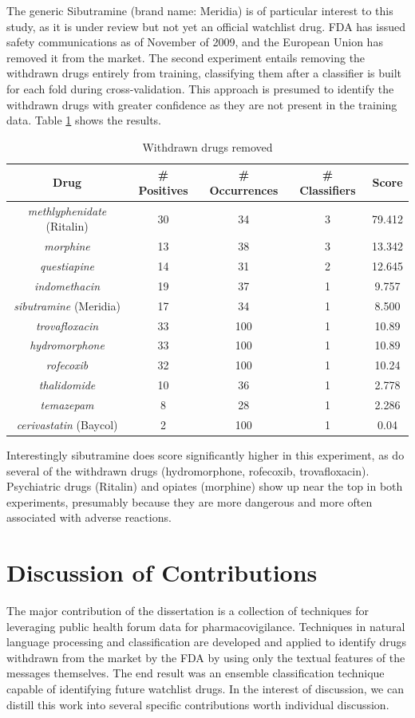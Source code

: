 \documentclass[twoside,11pt]{article}
\begin{document}
The generic Sibutramine (brand name: Meridia) is of particular interest to this study, as it is under review but not yet an official watchlist drug. FDA has issued safety communications as of November of 2009, and the European Union has removed it from the market.
The second experiment entails removing the withdrawn drugs entirely from training, classifying them after a classifier is built for each fold during cross-validation. This approach is presumed to identify the withdrawn drugs with greater confidence as they are not present in the training data. Table \ref{table7} shows the results.
\begin{table}[H]
  \centering
  \caption{Withdrawn drugs removed}
  \label{table7}
  \begin{tabular}{||c|c|c|c|c||}
    \hline
    Drug & # Positives & # Occurrences & # Classifiers & Score \\
    \hline\hline
    \textit{methlyphenidate} (Ritalin) & 30 & 34 & 3 & 79.412 \\
    \hline
    \textit{morphine} & 13 & 38 & 3 & 13.342 \\
    \hline
    \textit{questiapine} & 14 & 31 & 2 & 12.645 \\
    \hline
    \textit{indomethacin} & 19 & 37 & 1 & 9.757 \\
    \hline
    \textit{sibutramine} (Meridia) & 17 & 34 & 1 & 8.500\\
    \hline\hline
    \textit{trovafloxacin} & 33 & 100 & 1 & 10.89\\
    \hline
    \textit{hydromorphone} & 33 & 100 & 1 & 10.89\\
    \hline
    \textit{rofecoxib} & 32 & 100 & 1 & 10.24 \\
    \hline
    \textit{thalidomide} & 10 & 36 & 1 & 2.778\\
    \hline
    \textit{temazepam} & 8 & 28 & 1 & 2.286\\
    \hline
    \textit{cerivastatin} (Baycol) & 2 & 100 & 1 & 0.04\\
    \hline
  \end{tabular}
\end{table}
Interestingly sibutramine does score significantly higher in this experiment, as do several of the withdrawn drugs (hydromorphone, rofecoxib, trovafloxacin). Psychiatric drugs (Ritalin) and opiates (morphine) show up near the top in both experiments, presumably because they are more dangerous and more often associated with adverse reactions.

\section{Discussion of Contributions}
The major contribution of the dissertation is a collection of techniques for leveraging public health forum data for pharmacovigilance. Techniques in natural language processing and classification are developed and applied to identify drugs withdrawn from the market by the FDA by using only the textual features of the messages themselves. The end result was an ensemble classification technique capable of identifying future watchlist drugs. In the interest of discussion, we can distill this work into several specific contributions worth individual discussion.
\end{document}
